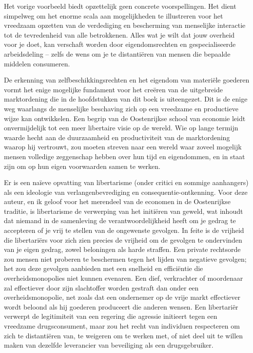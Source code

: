 Het vorige voorbeeld biedt opzettelijk geen concrete voorspellingen. Het dient simpelweg om het enorme scala aan mogelijkheden te illustreren voor het vreedzaam opzetten van de verdediging en bescherming van menselijke interactie tot de tevredenheid van alle betrokkenen. Alles wat je wilt dat jouw overheid voor je doet, kan verschaft worden door eigendomsrechten en gespecialiseerde arbeidsdeling -- zelfs de wens om je te distantiëren van mensen die bepaalde middelen consumeren.

De erkenning van zelfbeschikkingsrechten en het eigendom van materiële goederen vormt het enige mogelijke fundament voor het creëren van de uitgebreide marktordening die in de hoofdstukken van dit boek is uiteengezet. Dit is de enige weg waarlangs de menselijke beschaving zich op een vreedzame en productieve wijze kan ontwikkelen. Een begrip van de Oostenrijkse school van economie leidt onvermijdelijk tot een meer libertaire visie op de wereld. Wie op lange termijn waarde hecht aan de duurzaamheid en productiviteit van de marktordening waarop hij vertrouwt, zou moeten streven naar een wereld waar zoveel mogelijk mensen volledige zeggenschap hebben over hun tijd en eigendommen, en in staat zijn om op hun eigen voorwaarden samen te werken.

Er is een naïeve opvatting van libertarisme (onder critici en sommige aanhangers) als een ideologie van verlangenbevrediging en consequentie-ontkenning. Voor deze auteur, en ik geloof voor het merendeel van de economen in de Oostenrijkse traditie, is libertarisme de verwerping van het initiëren van geweld, wat inhoudt dat niemand in de samenleving de verantwoordelijkheid heeft om je gedrag te accepteren of je vrij te stellen van de ongewenste gevolgen. In feite is de vrijheid die libertariërs voor zich zien precies de vrijheid om de gevolgen te ondervinden van je eigen gedrag, zowel beloningen als harde straffen. Een private rechtsorde zou mensen niet proberen te beschermen tegen het lijden van negatieve gevolgen; het zou deze gevolgen aanbieden met een snelheid en efficiëntie die overheidsmonopolies niet kunnen evenaren. Een dief, verkrachter of moordenaar zal effectiever door zijn slachtoffer worden gestraft dan onder een overheidsmonopolie, net zoals dat een ondernemer op de vrije markt effectiever wordt beloond als hij goederen produceert die anderen wensen. Een libertariër verwerpt de legitimiteit van een regering die agressie initieert tegen een vreedzame drugsconsument, maar zou het recht van individuen respecteren om zich te distantiëren van, te weigeren om te werken met, of niet deel uit te willen maken van dezelfde leverancier van beveiliging als een drugsgebruiker.

